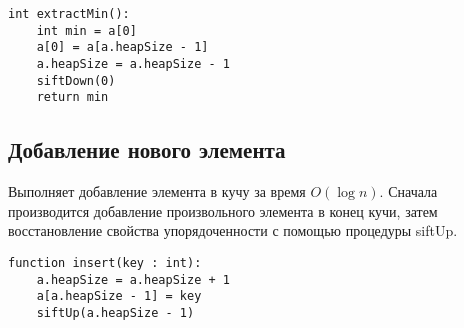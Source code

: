 \begin{verbatim}
int extractMin():
    int min = a[0]
    a[0] = a[a.heapSize - 1]
    a.heapSize = a.heapSize - 1
    siftDown(0)
    return min
\end{verbatim}

\subsection{Добавление нового элемента}

Выполняет добавление элемента в кучу за время $O(\log n)$.
Сначала производится добавление произвольного элемента в конец кучи, затем восстановление свойства упорядоченности с помощью процедуры siftUp.

\begin{verbatim}
function insert(key : int):
    a.heapSize = a.heapSize + 1
    a[a.heapSize - 1] = key
    siftUp(a.heapSize - 1)
\end{verbatim}
